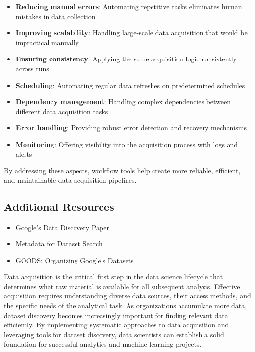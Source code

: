 \documentclass[12pt]{article}
\begin{document}
\begin{enumerate}
\begin{tcolorbox}[colback=blue!5!white,colframe=blue!75!black,title={Solution}]
    \begin{itemize}
        \item \textbf{Reducing manual errors}: Automating repetitive tasks eliminates human mistakes in data collection
        \item \textbf{Improving scalability}: Handling large-scale data acquisition that would be impractical manually
        \item \textbf{Ensuring consistency}: Applying the same acquisition logic consistently across runs
        \item \textbf{Scheduling}: Automating regular data refreshes on predetermined schedules
        \item \textbf{Dependency management}: Handling complex dependencies between different data acquisition tasks
        \item \textbf{Error handling}: Providing robust error detection and recovery mechanisms
        \item \textbf{Monitoring}: Offering visibility into the acquisition process with logs and alerts
    \end{itemize}
    
    By addressing these aspects, workflow tools help create more reliable, efficient, and maintainable data acquisition pipelines.
    \end{tcolorbox}
\end{enumerate}

\subsection{Additional Resources}

\begin{itemize}
    \item \href{https://storage.googleapis.com/pub-tools-public-publication-data/pdf/afd0602172f297bccdb4ee720bc3832e90e62042.pdf}{Google's Data Discovery Paper}
    \item \href{https://storage.googleapis.com/pub-tools-public-publication-data/pdf/45390.pdf}{Metadata for Dataset Search}
    \item \href{https://static.googleusercontent.com/media/research.google.com/en//pubs/archive/45a9dcf23dbdfa24dbced358f825636c58518afa.pdf}{GOODS: Organizing Google's Datasets}
\end{itemize}

\begin{tcolorbox}[colback=red!5!white,colframe=red!75!black,title={Key Takeaway}]
Data acquisition is the critical first step in the data science lifecycle that determines what raw material is available for all subsequent analysis. Effective acquisition requires understanding diverse data sources, their access methods, and the specific needs of the analytical task. As organizations accumulate more data, dataset discovery becomes increasingly important for finding relevant data efficiently. By implementing systematic approaches to data acquisition and leveraging tools for dataset discovery, data scientists can establish a solid foundation for successful analytics and machine learning projects.
\end{tcolorbox}
\end{document}
